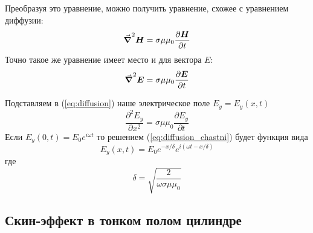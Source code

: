 \documentclass[a4paper,12pt]{article}
\theoremstyle{plain} %
\theoremstyle{definition} %
\theoremstyle{remark} %
\begin{document}
	Преобразуя это уравнение, можно получить уравнение, схожее с уравнением диффузии:
	\begin{equation}
		\grad^2\vb*{H}=\sigma\mu\mu_0 \frac{\partial \vb*{H}}{\partial t}\label{eq:laplacian_H}
	\end{equation}
	Точно такое же уравнение имеет место и для вектора $E:$
	\begin{equation}
		\grad^2\vb*{E}=\sigma\mu\mu_0 \frac{\partial \vb*{E}}{\partial t}\label{eq:diffusion}
	\end{equation}
	
	Подставляем в (\ref{eq:diffusion}) наше электрическое поле $E_y=E_y(x,t)$
	\begin{equation}
		\frac{\partial^2 E_y}{\partial x^2} = \sigma\mu\mu_0\frac{\partial E_y}{\partial t}
		\label{eq:diffusion_chastni}
	\end{equation}
	Если $E_y(0,t)=E_0 e^{i\omega t}$ то решением (\ref{eq:diffusion_chastni}) будет функция вида
	\begin{equation}
		E_y(x,t)=E_0 e^{-x/\delta} e^{i(\omega t - x/\delta)}
		\label{eq:skin_effect_poluprostranstvo}
	\end{equation}
	где
	\begin{equation}
		\delta = \sqrt{\frac{2}{\omega\sigma\mu\mu_0}}
		\label{eq:delta}
	\end{equation}
	
	\subsection{Скин-эффект в тонком полом цилиндре}
\end{document}

